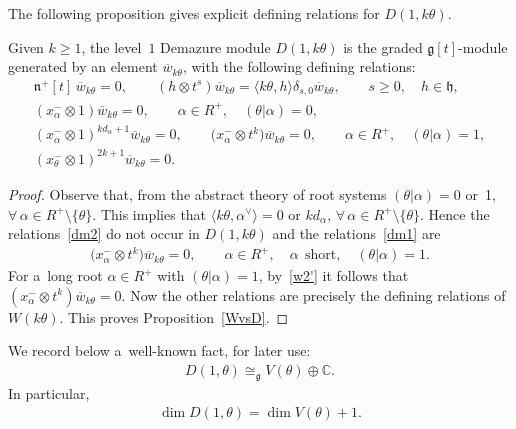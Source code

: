 \documentclass[pdftex]{sigma}
\numberwithin{equation}{section}
\begin{document}
The following proposition gives explicit def\/ining relations for $D(1,k\theta)$.
\begin{proposition}
\label{WvsD}
Given $k\geq 1$, the level~$1$ Demazure module $D(1,k\theta)$ is the graded $\mathfrak{g}[t]$-module generated by an
element $\overline{w}_{k\theta}$, with the following defining relations:
\begin{gather*}
\mathfrak{n}^{+}[t]\, \overline{w}_{k\theta}=0,
\qquad
(h \otimes t^s) \overline{w}_{k\theta} = \langle k\theta, h\rangle \delta_{s,0} \overline{w}_{k\theta},
\qquad
s\geq0,
\quad
h\in\mathfrak{h},
\\
(x^{-}_{\alpha}\otimes 1) \overline{w}_{k\theta}=0,
\qquad
\alpha\in R^+,
\quad
(\theta|\alpha)=0,
\\
(x^{-}_{\alpha} \otimes 1)^{kd_{\alpha}+1} \overline{w}_{k\theta}=0,
\qquad
\big(x^{-}_{\alpha} \otimes t^k\big) \overline{w}_{k\theta}=0,
\qquad
\alpha\in R^+,
\quad
(\theta|\alpha)=1,
\\
(x^{-}_{\theta} \otimes 1)^{2k+1} \overline{w}_{k\theta}=0.
\end{gather*}
\end{proposition}
\begin{proof}
Observe that, from the abstract theory of root systems $(\theta|\alpha)= 0$ or~1,
$\forall\, \alpha \in R^{+}\setminus \{\theta\}$.
This implies that $\langle k\theta, \alpha^{\vee}\rangle = 0$ or $kd_{\alpha}$, $\forall\, \alpha \in R^{+}\setminus \{\theta\}$.
Hence the relations~\eqref{dm2} do not occur in $D(1,k\theta)$ and the relations~\eqref{dm1} are
\begin{gather*}
\big(x^{-}_{\alpha} \otimes t^k\big) \overline{w}_{k\theta}=0,
\qquad
\alpha\in R^+,
\quad
\alpha~~\text{short},
\quad
(\theta|\alpha)=1.
\end{gather*}
For a~long root $\alpha\in R^+$ with $(\theta|\alpha)=1$, by~\eqref{w2'} it follows that $(x^{-}_{\alpha} \otimes t^k) \overline{w}_{k\theta}=0$.
Now the other relations are precisely the def\/ining relations of $W(k\theta)$. This proves Proposition~\ref{WvsD}.
\end{proof}
We record below a~well-known fact, for later use:
\begin{gather*}
D(1, \theta)\cong_{\mathfrak{g}} V(\theta) \oplus \mathbb{C}.
\end{gather*}
In particular,
\begin{gather}
\label{dimd}
\dim D(1, \theta)= \dim V(\theta)+1.
\end{gather}
\end{document}
